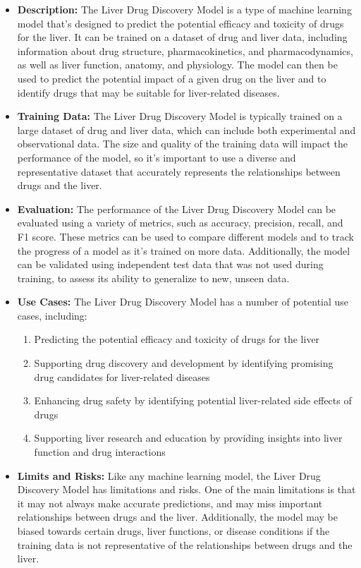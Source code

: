 \begin{itemize}
\begin{itemize}
    \item \textbf{Description:} The Liver Drug Discovery Model is a type of machine learning model that's designed to predict the potential efficacy and toxicity of drugs for the liver. It can be trained on a dataset of drug and liver data, including information about drug structure, pharmacokinetics, and pharmacodynamics, as well as liver function, anatomy, and physiology. The model can then be used to predict the potential impact of a given drug on the liver and to identify drugs that may be suitable for liver-related diseases.
    \item \textbf{Training Data:} The Liver Drug Discovery Model is typically trained on a large dataset of drug and liver data, which can include both experimental and observational data. The size and quality of the training data will impact the performance of the model, so it's important to use a diverse and representative dataset that accurately represents the relationships between drugs and the liver.
    \item \textbf{Evaluation:} The performance of the Liver Drug Discovery Model can be evaluated using a variety of metrics, such as accuracy, precision, recall, and F1 score. These metrics can be used to compare different models and to track the progress of a model as it's trained on more data. Additionally, the model can be validated using independent test data that was not used during training, to assess its ability to generalize to new, unseen data.
    \item \textbf{Use Cases:} The Liver Drug Discovery Model has a number of potential use cases, including:
        \begin{enumerate}  
            \item Predicting the potential efficacy and toxicity of drugs for the liver
            \item Supporting drug discovery and development by identifying promising drug candidates for liver-related diseases
            \item Enhancing drug safety by identifying potential liver-related side effects of drugs
            \item Supporting liver research and education by providing insights into liver function and drug interactions
        \end{enumerate}
    \item \textbf{Limits and Risks:} Like any machine learning model, the Liver Drug Discovery Model has limitations and risks. One of the main limitations is that it may not always make accurate predictions, and may miss important relationships between drugs and the liver. Additionally, the model may be biased towards certain drugs, liver functions, or disease conditions if the training data is not representative of the relationships between drugs and the liver.

\end{itemize}
\end{itemize}
